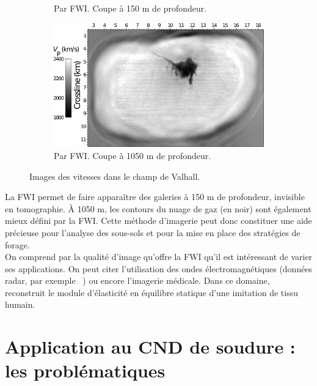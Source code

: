 \begin{figure}[!h]
\begin{subfigure}[b]{0.4\textwidth}
        \caption{Par FWI. Coupe à 150 m de profondeur.}
        \label{}
    \end{subfigure}
    \hspace{0.5cm}
    \begin{subfigure}[b]{0.4\textwidth}
        \includegraphics[width=\textwidth]{img/geophy4.png}
        \caption{Par FWI. Coupe à 1050 m de profondeur.}
        \label{}
    \end{subfigure}
    \caption{Images des vitesses dans le champ de Valhall.\label{valhall}}
\end{figure} 
   
La FWI permet de faire apparaître des galeries à 150 m de profondeur, invisible en tomographie. À 1050 m, les contours du nuage de gaz (en noir) sont également mieux défini par la FWI. Cette méthode d'imagerie peut donc constituer une aide précieuse pour l'analyse des sous-sols et pour la mise en place des stratégies de forage.\\

On comprend par la qualité d'image qu'offre la FWI qu'il est intéressant de varier ses applications. On peut citer l'utilisation des ondes électromagnétiques (données radar, par exemple ~\cite{lopes}) ou encore l'imagerie médicale. Dans ce domaine, \cite{oberai_03,oberai_04} reconstruit le module d'élasticité en équilibre statique d'une imitation de tissu humain.


\section{Application au CND de soudure : les problématiques}

